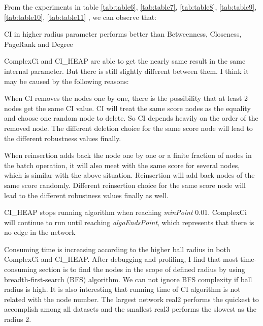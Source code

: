 \documentclass{article}
\begin{document}
	
	From the experiments in table \ref{tab:table6}, \ref{tab:table7}, \ref{tab:table8}, \ref{tab:table9}, \ref{tab:table10}, \ref{tab:table11} , we can observe that:
	
	\begin{enumerate}
		
		
	\begin{item}
		CI in higher radius parameter performs better than Betweenness, Closeness, PageRank and Degree
	\end{item}		
		
		\begin{item}
			ComplexCi and CI\_HEAP are able to get the nearly same result in the same internal parameter. But there is still slightly different between them. I think it may be caused by the following reasons:
			
			\begin{enumerate}
				\begin{item}
					When CI removes the nodes one by one, there is the possibility that at least 2 nodes get the same CI value. CI will treat the same score nodes as the equality and choose one random node to delete. So CI depends heavily on the order of the removed node. The different deletion choice for the same score node will lead to the different robustness values finally. 
				\end{item}
				\begin{item}
					When reinsertion adds back the node one by one or a finite fraction of nodes in the batch operation, it will also meet with the same score for several nodes, which is similar with the above situation. Reinsertion will add back nodes of the same score randomly. Different reinsertion choice for the same score node will lead to the different robustness values finally as well.
				\end{item}		
				\begin{item}
					CI\_HEAP stops running algorithm when reaching \textit{minPoint} 0.01. ComplexCi will continue to run until reaching \textit{algoEndsPoint}, which represents that there is no edge in the network
				\end{item}			
				
			\end{enumerate}			
			
			
		\end{item}			
		
		\begin{item}
			Consuming time is increasing according to the higher ball radius in both ComplexCi and CI\_HEAP. After debugging and profiling, I find that most time-consuming section is to find the nodes in the scope of defined radius by using breadth-first-search (BFS) algorithm. We can not ignore BFS complexity if ball radius is high. It is also interesting that running time of CI algorithm is not related with the node number. The largest network real2 performs the quickest to accomplish among all datasets and the smallest real3 performs the slowest as the radius 2.
		\end{item}


\end{enumerate}
\end{document}
